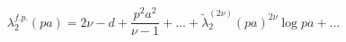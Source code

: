 \begin{equation}
\lambda_2^{f.p.}(pa)=2\nu-d+\frac {p^2a^2}
{\nu-1}+...+\tilde{\lambda}_2^{(2\nu)}(pa)^{2\nu}\log{pa}+...
\end{equation}

